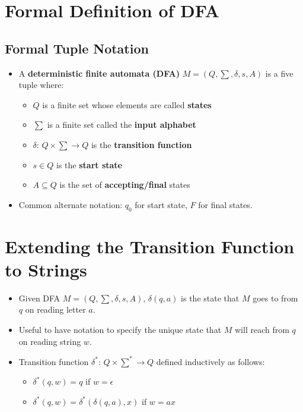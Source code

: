 \documentclass[12pt]{article}
\begin{document}
\section{Formal Definition of DFA}

\subsection{Formal Tuple Notation}
\begin{itemize}
    \item A \textbf{deterministic finite automata (DFA)} $M = (Q, \sum, \delta, s, A)$ is a five tuple where:
    \begin{itemize}
        \item $Q$ is a finite set whose elements are called \textbf{states}
        \item $\sum$ is a finite set called the \textbf{input alphabet}
        \item $\delta$: $Q \times \sum \rightarrow Q$ is the \textbf{transition function}
        \item $s \in Q$ is the \textbf{start state}
        \item $A \subseteq Q$ is the set of \textbf{accepting/final} states
    \end{itemize}
    \item Common alternate notation: $q_0$ for start state, $F$ for final states.
\end{itemize}

\section{Extending the Transition Function to Strings}
\begin{itemize}
    \item Given DFA $M = (Q, \sum, \delta, s, A)$, $\delta(q, a)$ is the state that $M$ goes to from $q$ on reading letter $a$.
    \item Useful to have notation to specify the unique state that $M$ will reach from $q$ on reading string $w$.
    \item Transition function $\delta^{\ast}$: $Q \times \sum^{\ast} \rightarrow Q$ defined inductively as follows:
    \begin{itemize}
        \item $\delta^{\ast}(q,w) = q$ if $w = \epsilon$
        \item $\delta^{\ast}(q,w) = \delta^{\ast}(\delta(q,a),x)$ if $w = ax$
    \end{itemize}
\end{itemize}
\end{document}
